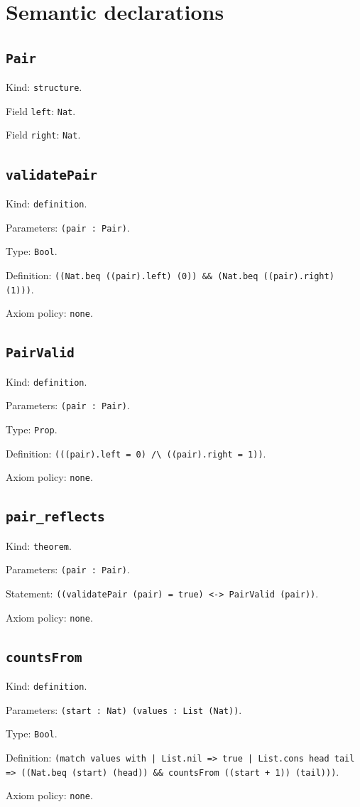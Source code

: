 \documentclass[11pt]{article}
\begin{document}
\section*{Semantic declarations}
\subsection*{\texttt{Pair}}
\noindent Kind: \texttt{structure}.\par
\noindent Field \texttt{left}: \texttt{Nat}.\par
\noindent Field \texttt{right}: \texttt{Nat}.\par
\subsection*{\texttt{validatePair}}
\noindent Kind: \texttt{definition}.\par
\noindent Parameters: \texttt{(pair : Pair)}.\par
\noindent Type: \texttt{Bool}.\par
\noindent Definition: \texttt{((Nat.beq ((pair).left) (0)) \&\& (Nat.beq ((pair).right) (1)))}.\par
\noindent Axiom policy: \texttt{none}.\par
\subsection*{\texttt{PairValid}}
\noindent Kind: \texttt{definition}.\par
\noindent Parameters: \texttt{(pair : Pair)}.\par
\noindent Type: \texttt{Prop}.\par
\noindent Definition: \texttt{(((pair).left = 0) /\textbackslash{} ((pair).right = 1))}.\par
\noindent Axiom policy: \texttt{none}.\par
\subsection*{\texttt{pair\_reflects}}
\noindent Kind: \texttt{theorem}.\par
\noindent Parameters: \texttt{(pair : Pair)}.\par
\noindent Statement: \texttt{((validatePair (pair) = true) <-> PairValid (pair))}.\par
\noindent Axiom policy: \texttt{none}.\par
\subsection*{\texttt{countsFrom}}
\noindent Kind: \texttt{definition}.\par
\noindent Parameters: \texttt{(start : Nat) (values : List (Nat))}.\par
\noindent Type: \texttt{Bool}.\par
\noindent Definition: \texttt{(match values with | List.nil => true | List.cons head tail => ((Nat.beq (start) (head)) \&\& countsFrom ((start + 1)) (tail)))}.\par
\noindent Axiom policy: \texttt{none}.\par
\end{document}
